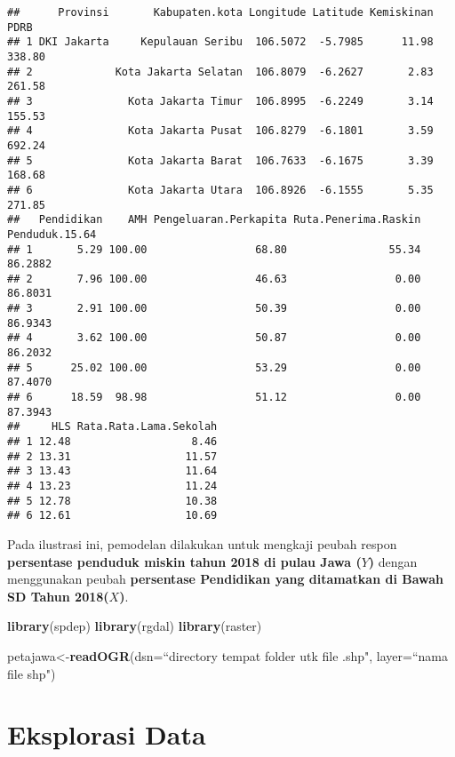 \documentclass[
]{book}
\newenvironment{Shaded}{\begin{snugshade}}{\end{snugshade}}
\newcommand{\DataTypeTok}[1]{\textcolor[rgb]{0.13,0.29,0.53}{#1}}
\newcommand{\KeywordTok}[1]{\textcolor[rgb]{0.13,0.29,0.53}{\textbf{#1}}}
\newcommand{\NormalTok}[1]{#1}
\newcommand{\StringTok}[1]{\textcolor[rgb]{0.31,0.60,0.02}{#1}}
\begin{document}
\begin{verbatim}
##      Provinsi       Kabupaten.kota Longitude Latitude Kemiskinan   PDRB
## 1 DKI Jakarta     Kepulauan Seribu  106.5072  -5.7985      11.98 338.80
## 2             Kota Jakarta Selatan  106.8079  -6.2627       2.83 261.58
## 3               Kota Jakarta Timur  106.8995  -6.2249       3.14 155.53
## 4               Kota Jakarta Pusat  106.8279  -6.1801       3.59 692.24
## 5               Kota Jakarta Barat  106.7633  -6.1675       3.39 168.68
## 6               Kota Jakarta Utara  106.8926  -6.1555       5.35 271.85
##   Pendidikan    AMH Pengeluaran.Perkapita Ruta.Penerima.Raskin Penduduk.15.64
## 1       5.29 100.00                 68.80                55.34        86.2882
## 2       7.96 100.00                 46.63                 0.00        86.8031
## 3       2.91 100.00                 50.39                 0.00        86.9343
## 4       3.62 100.00                 50.87                 0.00        86.2032
## 5      25.02 100.00                 53.29                 0.00        87.4070
## 6      18.59  98.98                 51.12                 0.00        87.3943
##     HLS Rata.Rata.Lama.Sekolah
## 1 12.48                   8.46
## 2 13.31                  11.57
## 3 13.43                  11.64
## 4 13.23                  11.24
## 5 12.78                  10.38
## 6 12.61                  10.69
\end{verbatim}

Pada ilustrasi ini, pemodelan dilakukan untuk mengkaji peubah respon \textbf{persentase penduduk miskin tahun 2018 di pulau Jawa (\(Y\))} dengan menggunakan peubah \textbf{persentase Pendidikan yang ditamatkan di Bawah SD Tahun 2018(\(X\))}.

\begin{Shaded}
\begin{Highlighting}[]
\KeywordTok{library}\NormalTok{(spdep)}
\KeywordTok{library}\NormalTok{(rgdal)}
\KeywordTok{library}\NormalTok{(raster)}

\NormalTok{petajawa\textless{}{-}}\KeywordTok{readOGR}\NormalTok{(}\DataTypeTok{dsn=}\NormalTok{“directory tempat folder utk file .shp}\StringTok{", layer=“nama file shp"}\NormalTok{)}
\end{Highlighting}
\end{Shaded}

\hypertarget{eksplorasi-data}{%
\section{Eksplorasi Data}\label{eksplorasi-data}}
\end{document}

